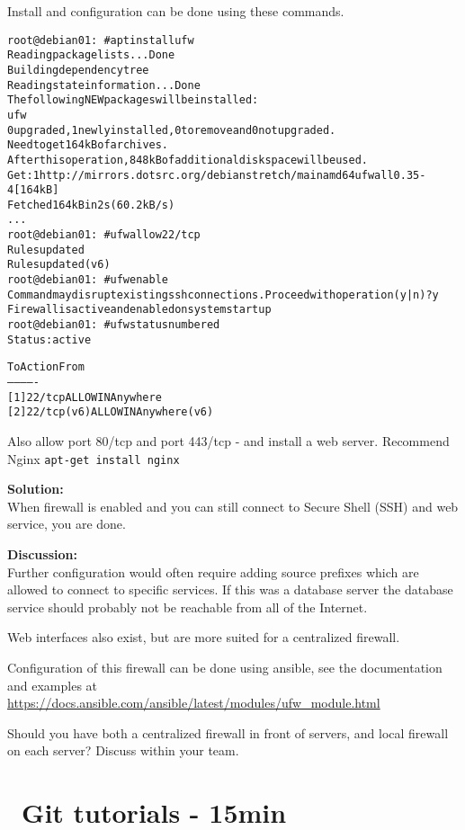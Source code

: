 \documentclass[a4paper,11pt,notitlepage]{report}
\begin{document}
Install and configuration can be done using these commands.
\begin{alltt}
root@debian01:~# apt install ufw
Reading package lists... Done
Building dependency tree
Reading state information... Done
The following NEW packages will be installed:
  ufw
0 upgraded, 1 newly installed, 0 to remove and 0 not upgraded.
Need to get 164 kB of archives.
After this operation, 848 kB of additional disk space will be used.
Get:1 http://mirrors.dotsrc.org/debian stretch/main amd64 ufw all 0.35-4 [164 kB]
Fetched 164 kB in 2s (60.2 kB/s)
...
root@debian01:~# ufw allow 22/tcp
Rules updated
Rules updated (v6)
root@debian01:~# ufw enable
Command may disrupt existing ssh connections. Proceed with operation (y|n)? y
Firewall is active and enabled on system startup
root@debian01:~# ufw status numbered
Status: active

     To                         Action      From
     --                         ------      ----
[ 1] 22/tcp                     ALLOW IN    Anywhere
[ 2] 22/tcp (v6)                ALLOW IN    Anywhere (v6)
\end{alltt}

Also allow port 80/tcp and port 443/tcp - and install a web server. Recommend Nginx \verb+apt-get install nginx+

{\bf Solution:}\\
When firewall is enabled and you can still connect to Secure Shell (SSH) and web service, you are done.

{\bf Discussion:}\\
Further configuration would often require adding source prefixes which are allowed to connect to specific services. If this was a database server the database service should probably not be reachable from all of the Internet.

Web interfaces also exist, but are more suited for a centralized firewall.

Configuration of this firewall can be done using ansible, see the documentation and examples at \url{https://docs.ansible.com/ansible/latest/modules/ufw_module.html}

Should you have both a centralized firewall in front of servers, and local firewall on each server? Discuss within your team.


\chapter{\faInfoCircle\ Git tutorials - 15min}
\label{ex:git-tutorial}
\end{document}
